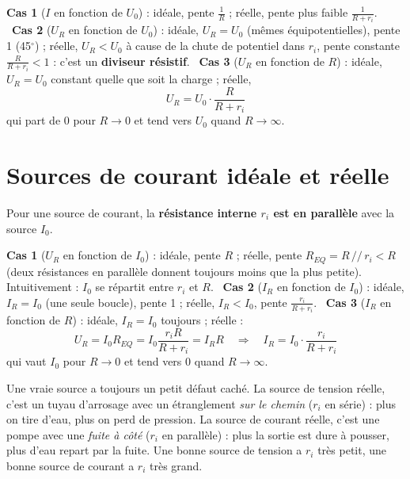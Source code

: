 \begin{propbox}[title=Les trois cas de la diapositive (charge $R$)]
\textbf{Cas 1} ($I$ en fonction de $U_0$) : idéale, pente $\frac{1}{R}$ ; réelle, pente plus
faible $\frac{1}{R+r_i}$. \
\textbf{Cas 2} ($U_R$ en fonction de $U_0$) : idéale, $U_R = U_0$ (mêmes équipotentielles),
pente 1 (45\ensuremath{^\circ}) ; réelle, $U_R < U_0$ à cause de la chute de potentiel dans $r_i$, pente
constante $\frac{R}{R+r_i} < 1$ : c'est un \textbf{diviseur résistif}. \
\textbf{Cas 3} ($U_R$ en fonction de $R$) : idéale, $U_R = U_0$ constant quelle que soit la
charge ; réelle,
\[ U_R = U_0\cdot\frac{R}{R+r_i} \]
qui part de 0 pour $R\to 0$ et tend vers $U_0$ quand $R\to\infty$.
\end{propbox}

\section{Sources de courant idéale et réelle}


\begin{defnbox}[title=Source de courant idéale / réelle]
Pour une source de courant, la \textbf{résistance interne $r_i$ est en parallèle} avec la
source $I_0$.
\end{defnbox}

\begin{propbox}[title=Les trois cas (charge $R$)]
\textbf{Cas 1} ($U_R$ en fonction de $I_0$) : idéale, pente $R$ ; réelle, pente
$R_{EQ} = R\,/\!/\,r_i < R$ (deux résistances en parallèle donnent toujours moins que la plus
petite). Intuitivement : $I_0$ se répartit entre $r_i$ et $R$. \
\textbf{Cas 2} ($I_R$ en fonction de $I_0$) : idéale, $I_R = I_0$ (une seule boucle), pente
1 ; réelle, $I_R < I_0$, pente $\frac{r_i}{R+r_i}$. \
\textbf{Cas 3} ($I_R$ en fonction de $R$) : idéale, $I_R = I_0$ toujours ; réelle :
\[ U_R = I_0 R_{EQ} = I_0\frac{r_i R}{R+r_i} = I_R R \quad\Rightarrow\quad
   I_R = I_0\cdot\frac{r_i}{R+r_i} \]
qui vaut $I_0$ pour $R\to 0$ et tend vers 0 quand $R\to\infty$.
\end{propbox}

\begin{goatbox}
Une vraie source a toujours un petit défaut caché. La source de tension réelle, c'est un
tuyau d'arrosage avec un étranglement \emph{sur le chemin} ($r_i$ en série) : plus on tire
d'eau, plus on perd de pression. La source de courant réelle, c'est une pompe avec une
\emph{fuite à côté} ($r_i$ en parallèle) : plus la sortie est dure à pousser, plus d'eau
repart par la fuite. Une bonne source de tension a $r_i$ très petit, une bonne source de
courant a $r_i$ très grand.
\end{goatbox}

